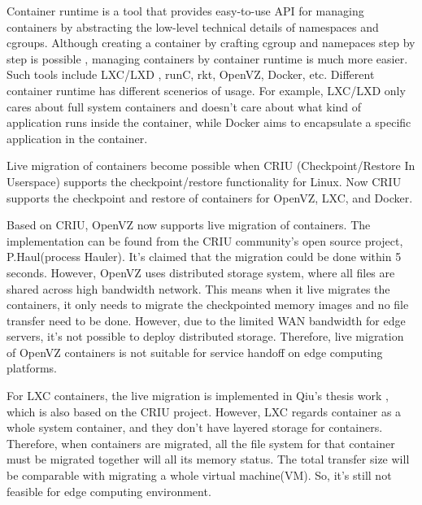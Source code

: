 
Container runtime is a tool that provides easy-to-use API for managing containers by abstracting the low-level technical details of namespaces and cgroups. 
Although creating a container by crafting cgroup and namepaces step by step is possible \cite{conScratch}, managing containers by container runtime is much more easier.  Such tools include LXC/LXD\cite{LXC} ,
runC\cite{runc},
rkt\cite{rkt}, 
OpenVZ\cite{openvz}, 
Docker\cite{docker}, etc. Different container runtime has different scenerios of usage. For example, LXC/LXD only cares about full system containers and doesn’t care about what kind of application runs inside the container, while Docker aims to encapsulate a specific application in the container.  

Live migration of containers become possible when CRIU (Checkpoint/Restore In Userspace)\cite{criu} supports the checkpoint/restore functionality for Linux. 
Now CRIU supports the checkpoint and restore of containers for OpenVZ, LXC, and Docker. 


Based on CRIU, OpenVZ now supports live migration of containers. The implementation can be found from the CRIU community's open source project, P.Haul(process Hauler)\cite{phaul}.  It's claimed that the migration could be done within 5 seconds\cite{livmigcon}.
However, OpenVZ uses distributed storage system\cite{openvzfs}, where all files are shared across high bandwidth network. 
This means when it live migrates the containers, it only needs to migrate the checkpointed memory images and no file transfer need to be done. 
However, due to the limited WAN bandwidth for edge servers, it's not possible to deploy distributed storage. Therefore, live migration of OpenVZ containers is not suitable for service handoff on edge computing platforms.

For LXC containers, the live migration is implemented in Qiu's thesis work \cite{qiu2016evaluating}, which is also based on the CRIU project. However, LXC regards container as a whole system container, and they don't have layered storage for containers. Therefore, when containers are migrated, all the file system for that container must be migrated together will all its memory status. The total transfer size will be comparable with migrating a whole virtual machine(VM). So, it's still not feasible for edge computing environment. 

